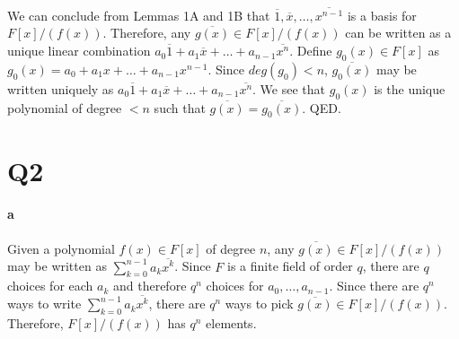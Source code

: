 \documentclass[]{article}
\begin{document}
	\paragraph{}
	We can conclude from Lemmas 1A and 1B that $\overbar{1}, \overbar{x}, \dots, \overbar{x^{n-1}}$ is a basis for $F[x]/(f(x))$.\newline
	Therefore, any $\overbar{g(x)} \in F[x]/(f(x))$ can be written as a unique linear combination $a_0\overbar{1} + a_1\overbar{x} + \dots + a_{n-1}\overbar{x^n}$.\newline
	Define $g_0(x) \in F[x]$ as $g_0(x) = a_0 + a_1x + \dots + a_{n-1}x^{n-1}$.\newline
	Since $deg(g_0) < n$, $\overbar{g_0(x)}$ may be written uniquely as $a_0\overbar{1} + a_1\overbar{x} + \dots + a_{n-1}\overbar{x^n}$.\newline
	We see that $g_0(x)$ is the unique polynomial of degree $< n$ such that $\overbar{g(x)} = \overbar{g_0(x)}$.\newline
	QED.


\section*{Q2}
	\paragraph{a}
	Given a polynomial $f(x) \in F[x]$ of degree $n$, any $\overbar{g(x)} \in F[x]/(f(x))$ may be written as $\sum_{k=0}^{n-1} a_k\overbar{x^k}$.\newline
	Since $F$ is a finite field of order $q$, there are $q$ choices for each $a_k$ and therefore $q^n$ choices for $a_0, \dots, a_{n-1}$.\newline
	Since there are $q^n$ ways to write $\sum_{k=0}^{n-1} a_k\overbar{x^k}$, there are $q^n$ ways to pick $\overbar{g(x)} \in F[x]/(f(x))$.\newline
	Therefore, $F[x]/(f(x))$ has $q^n$ elements.
\end{document}

